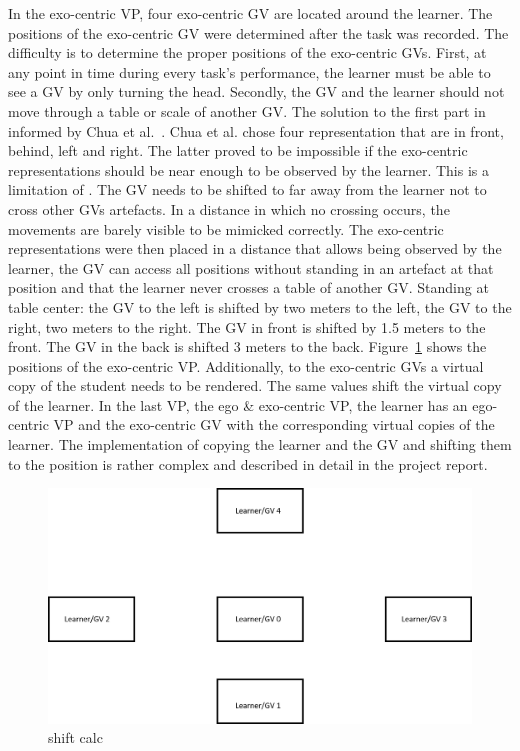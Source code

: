 In the exo-centric VP, four exo-centric GV are located around the learner. The positions of the exo-centric GV were determined after the task was recorded. The difficulty is to determine the proper positions of the exo-centric GVs. First, at any point in time during every task's performance, the learner must be able to see a GV by only turning the head. Secondly, the GV and the learner should not move through a table or scale of another GV. The solution to the first part in informed by Chua et al.~\cite{thaichichua}. Chua et al. chose four representation that are in front, behind, left and right. The latter proved to be impossible if the exo-centric representations should be near enough to be observed by the learner. This is a limitation of \exgo. The GV needs to be shifted to far away from the learner not to cross other GVs artefacts. In a distance in which no crossing occurs, the movements are barely visible to be mimicked correctly. The exo-centric representations were then placed in a distance that allows being observed by the learner, the GV can access all positions without standing in an artefact at that position and that the learner never crosses a table of another GV. Standing at table center: the GV to the left is shifted by two meters to the left, the GV to the right, two meters to the right. The GV in front is shifted by 1.5 meters to the front. The GV in the back is shifted 3 meters to the back. Figure~\ref{fig:multireppositions} shows the positions of the exo-centric VP. Additionally, to the exo-centric GVs a virtual copy of the student needs to be rendered. The same values shift the virtual copy of the learner. In the last VP, the ego \& exo-centric VP, the learner has an ego-centric VP and the exo-centric GV with the corresponding virtual copies of the learner. The implementation of copying the learner and the GV and shifting them to the position is rather complex and described in detail in the project report.\\
\begin{figure}[htb]
	\centering
	\includegraphics[width=\textwidth]{figures/positions.png}
	\caption[Positions of exo-centric GVs]{shift calc}
	\label{fig:multireppositions}
\end{figure}

